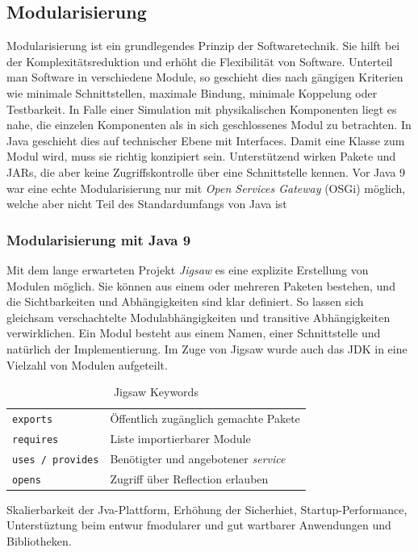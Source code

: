 \documentclass[a4paper,10.2pt,pdftex]{scrartcl}%
\begin{document}
\subsection{Modularisierung}
Modularisierung ist ein grundlegendes Prinzip der Softwaretechnik. Sie hilft bei der Komplexitätsreduktion und erhöht die Flexibilität von Software. Unterteil man Software in verschiedene Module, so geschieht dies nach gängigen Kriterien wie minimale Schnittstellen, maximale Bindung, minimale Koppelung oder Testbarkeit. In Falle einer Simulation mit physikalischen Komponenten liegt es nahe, die einzelen Komponenten als in sich geschlossenes Modul zu betrachten. In Java geschieht dies auf technischer Ebene mit Interfaces. Damit eine Klasse zum Modul wird, muss sie richtig konzipiert sein. Unterstützend wirken Pakete und JARs, die aber keine Zugriffskontrolle über eine Schnittstelle kennen. Vor Java 9 war eine echte Modularisierung nur mit \emph{Open Services Gateway} (OSGi) möglich, welche aber nicht Teil des Standardumfangs von Java ist \cite[S. 32f]{modul}
\subsubsection{Modularisierung mit Java 9} 
Mit dem lange erwarteten Projekt \emph{Jigsaw} es eine explizite Erstellung von Modulen möglich. Sie können aus einem oder mehreren Paketen bestehen, und die Sichtbarkeiten und Abhängigkeiten sind klar definiert. So lassen sich gleichsam verschachtelte Modulabhängigkeiten und transitive Abhängigkeiten verwirklichen. Ein Modul besteht aus einem Namen, einer Schnittstelle und natürlich der Implementierung. Im Zuge von Jigsaw wurde auch das JDK in eine Vielzahl von Modulen aufgeteilt\cite[S. 863]{inden}. 
\begin{table}
\begin{tabular}{ll}
\texttt{exports} & Öffentlich zugänglich gemachte Pakete \\
\texttt{requires} & Liste importierbarer Module \\
\texttt{uses / provides} & Benötigter und angebotener \emph{service} \\
\texttt{opens} & Zugriff über Reflection erlauben
\end{tabular} 
\caption{Jigsaw Keywords}
\end{table}
Skalierbarkeit der Jva-Plattform, Erhöhung der Sicherhiet, Startup-Performance, Unterstüztung beim entwur fmodularer und gut wartbarer Anwendungen und Bibliotheken. 
\end{document}
